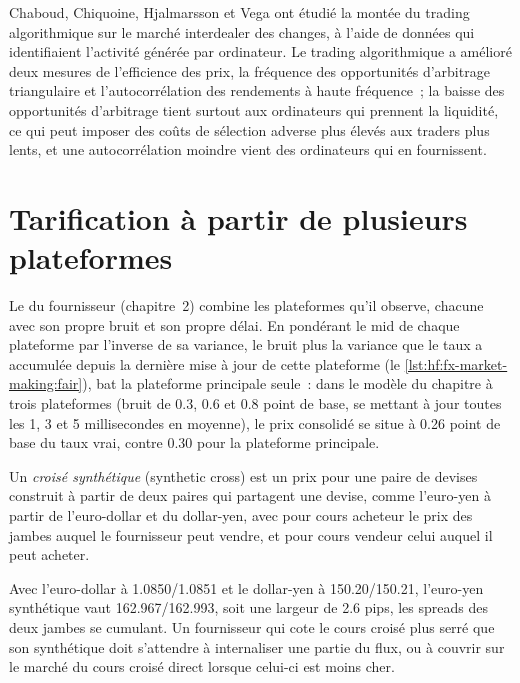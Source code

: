 Chaboud, Chiquoine, Hjalmarsson et Vega ont étudié la montée du trading algorithmique sur le marché interdealer des changes, à l'aide de données qui identifiaient
l'activité générée par ordinateur. Le trading algorithmique a amélioré deux mesures de l'efficience des prix, la fréquence des opportunités d'arbitrage triangulaire et
l'autocorrélation des rendements à haute fréquence~; la baisse des opportunités d'arbitrage tient surtout aux ordinateurs qui prennent la liquidité, ce qui peut imposer des coûts
de sélection adverse plus élevés aux traders plus lents, et une autocorrélation moindre vient des ordinateurs qui en fournissent.

\section{Tarification à partir de plusieurs plateformes}

Le  du fournisseur (chapitre~2) combine les plateformes qu'il observe, chacune avec son propre bruit et son propre délai. En pondérant le mid de chaque plateforme par
l'inverse de sa variance, le bruit plus la variance que le taux a accumulée depuis la dernière mise à jour de cette plateforme
(le \cref{lst:hf:fx-market-making:fair}), bat la plateforme principale seule~: dans le modèle du chapitre à trois plateformes (bruit de 0.3, 0.6 et 0.8 point de base,
se mettant à jour toutes les 1, 3 et 5 millisecondes en moyenne), le prix consolidé se situe à 0.26 point de base du taux vrai, contre 0.30 pour la plateforme principale.

\begin{definition}\label{def:hf:fx-market-making:cross}
Un \emph{croisé synthétique} (synthetic cross) est un prix pour une paire de devises construit à partir de deux paires qui partagent une devise, comme l'euro-yen à partir
de l'euro-dollar et du dollar-yen, avec pour cours acheteur le prix des jambes auquel le fournisseur peut vendre, et pour cours vendeur celui auquel il peut acheter.
\end{definition}

Avec l'euro-dollar à 1.0850/1.0851 et le dollar-yen à 150.20/150.21, l'euro-yen synthétique vaut 162.967/162.993, soit une largeur de 2.6 pips, les spreads des deux jambes
se cumulant. Un fournisseur qui cote le cours croisé plus serré que son synthétique doit s'attendre à internaliser une partie du flux, ou à couvrir
sur le marché du cours croisé direct lorsque celui-ci est moins cher.

